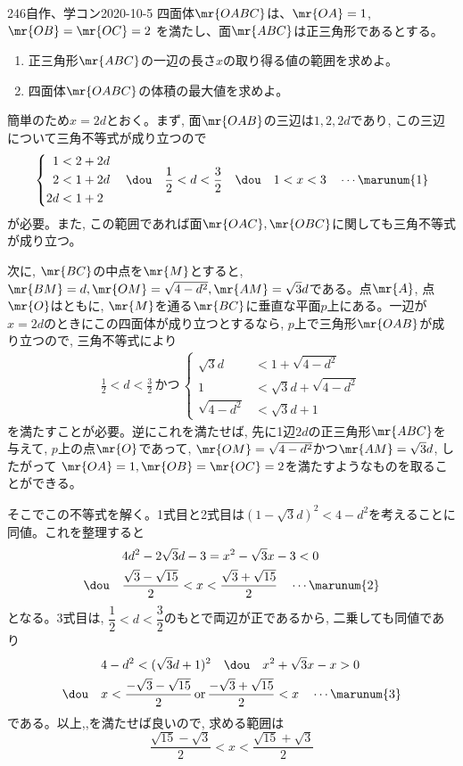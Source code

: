 \begin{prob}{246}{}{自作、学コン2020-10-5}
 四面体$\mr{OABC}$は、$\mr{OA}=1$, $\mr{OB}=\mr{OC}=2$ を満たし、面$\mr{ABC}$は正三角形であるとする。
 \begin{enumerate}
  \item 正三角形$\mr{ABC}$の一辺の長さ$x$の取り得る値の範囲を求めよ。
  \item 四面体$\mr{OABC}$の体積の最大値を求めよ。
 \end{enumerate}
\end{prob}
簡単のため$x=2d$とおく。まず, 面$\mr{OAB}$の三辺は$1,2,2d$であり, この三辺について三角不等式が成り立つので 
\begin{align*}
 \left\{
 \begin{aligned}
  1&<2+2d \\
  2&<1+2d \\
  2d&<1+2
 \end{aligned}
 \right. \quad\dou\quad \frac{1}{2}<d<\frac{3}{2} \quad\dou\quad 1<x<3 \quad \cdots\marunum{1}
\end{align*}
が必要。また, この範囲であれば面$\mr{OAC}, \mr{OBC}$に関しても三角不等式が成り立つ。

次に, $\mr{BC}$の中点を$\mr{M}$とすると, $\mr{BM}=d, \mr{OM}=\sqrt{4-d^{2}}, \mr{AM}=\sqrt{3}d$である。点$\mr{A}$, 点$\mr{O}$はともに, $\mr{M}$を通る$\mr{BC}$に垂直な平面$p$上にある。一辺が$x=2d$のときにこの四面体が成り立つとするなら, $p$上で三角形$\mr{OAB}$が成り立つので, 三角不等式により
\begin{align*}
 \frac{1}{2}<d<\frac{3}{2} \,\text{かつ}\,\left\{
 \begin{aligned}
  \sqrt{3}d&<1+\sqrt{4-d^2} \\
  1&<\sqrt{3}d+\sqrt{4-d^2} \\
  \sqrt{4-d^2}&<\sqrt{3}d+1
 \end{aligned}
 \right.
\end{align*}
を満たすことが必要。逆にこれを満たせば, 先に1辺$2d$の正三角形$\mr{ABC}$を与えて, $p$上の点$\mr{O}$であって, $\mr{OM}=\sqrt{4-d^{2}}$かつ$\mr{AM}=\sqrt{3}d$, したがって $\mr{OA}=1, \mr{OB}=\mr{OC}=2$を満たすようなものを取ることができる。

そこでこの不等式を解く。1式目と2式目は$(1-\sqrt{3}d)^{2} < 4-d^{2}$を考えることに同値。これを整理すると
\begin{align*}
 & 4d^2-2\sqrt{3}d-3=x^2-\sqrt{3}x-3 <0 \\
 \dou\quad &\frac{\sqrt{3}-\sqrt{15}}{2}<x<\frac{\sqrt{3}+\sqrt{15}}{2} \quad\cdots\marunum{2}
\end{align*}
となる。3式目は, $\dfrac{1}{2}< d < \dfrac{3}{2}$のもとで両辺が正であるから, 二乗しても同値であり
\begin{align*}
 & 4-d^2<(\sqrt{3}d+1)^2 \quad\dou\quad x^2+\sqrt{3}x-x>0 \\
 \dou\quad & x<\frac{-\sqrt{3}-\sqrt{15}}{2} \,\text{or}\, \frac{-\sqrt{3}+\sqrt{15}}{2} < x \quad\cdots\marunum{3}
\end{align*}
である。以上,,を満たせば良いので, 求める範囲は
\[ \dfrac{\sqrt{15}-\sqrt{3}}{2} < x  < \dfrac{\sqrt{15}+\sqrt{3}}{2} \]

